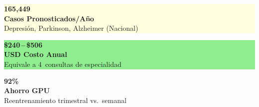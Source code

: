 \documentclass[12pt, letterpaper]{article}
\begin{document}
\begin{center}
\noindent
\begin{minipage}[t]{0.31\textwidth}
\centering
\colorbox{lightyellow}{%
\begin{minipage}[c][3.5cm]{\dimexpr\textwidth-30pt}
\centering
{\color{gold}\fontsize{30}{36}\selectfont\bfseries 165,449}\\[0.3cm]
{\small\bfseries Casos Pronosticados/Año}\\[0.15cm]
{\scriptsize\color{coolgray} Depresión, Parkinson, Alzheimer (Nacional)}
\end{minipage}}
\end{minipage}\hfill
\begin{minipage}[t]{0.31\textwidth}
\centering
\colorbox{lightgreen}{%
\begin{minipage}[c][3.5cm]{\dimexpr\textwidth-30pt}
\centering
{\color{teal}\fontsize{30}{36}\selectfont\bfseries \$240\,--\,\$506}\\[0.3cm]
{\small\bfseries USD Costo Anual}\\[0.15cm]
{\scriptsize\color{coolgray} Equivale a 4~consultas de especialidad}
\end{minipage}}
\end{minipage}\hfill
\begin{minipage}[t]{0.31\textwidth}
\centering
\colorbox{lightred}{%
\begin{minipage}[c][3.5cm]{\dimexpr\textwidth-30pt}
\centering
{\color{burgundy}\fontsize{36}{40}\selectfont\bfseries 92\%}\\[0.3cm]
{\small\bfseries Ahorro GPU}\\[0.15cm]
{\scriptsize\color{coolgray} Reentrenamiento trimestral vs.~semanal}
\end{minipage}}
\end{minipage}

\end{center}

\vspace{1.0cm}
\end{document}
